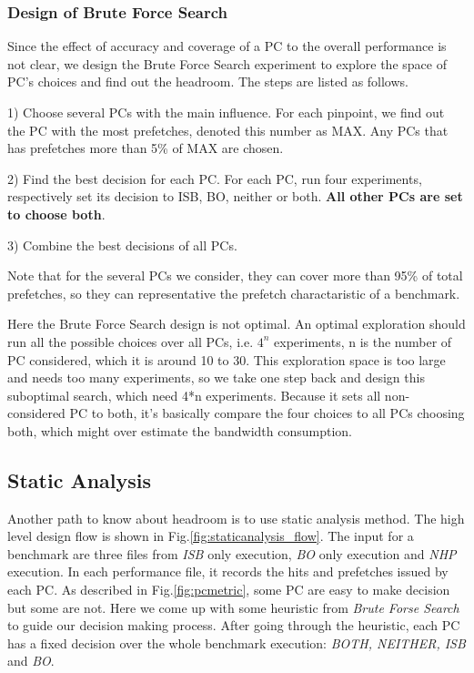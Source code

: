     \subsubsection{Design of Brute Force Search}
    \label{sec:designBFS}
    Since the effect of accuracy and coverage of a PC to the overall performance is not clear, we design the Brute Force Search experiment to explore the space of PC's choices and find out the headroom. The steps are listed as follows. \par
    1) Choose several PCs with the main influence. For each pinpoint, we find out the PC with the most prefetches, denoted this number as MAX. Any PCs that has prefetches more than 5\% of MAX are chosen.\par
    2) Find the best decision for each PC. For each PC, run four experiments, respectively set its decision to ISB, BO, neither or both. \textbf{All other PCs are set to choose both}.\par
    3) Combine the best decisions of all PCs.\par
    Note that for the several PCs we consider, they can cover more than 95\% of total prefetches, so they can representative the prefetch charactaristic of a benchmark. \par
    Here the Brute Force Search design is not optimal. An optimal exploration should run all the possible choices over all PCs, i.e. $4^{n}$ experiments, n is the number of PC considered, which it is around 10 to 30.
    This exploration space is too large and needs too many experiments, so we take one step back and design this suboptimal search, which need 4*n experiments. Because it sets all non-considered PC to both, it's basically compare the four choices to all PCs choosing both, which might over estimate the bandwidth consumption. \par

  \subsection{Static Analysis}
  \label{sec:staticanalysis}
  Another path to know about headroom is to use static analysis method. The high level design flow is shown in Fig.\ref{fig:staticanalysis_flow}. The input for a benchmark are three files from \emph{ISB} only execution, \emph{BO} only execution and \emph{NHP} execution. In each performance file, it records the hits and prefetches issued by each PC. As described in Fig.\ref{fig:pcmetric}, some PC are easy to make decision but some are not. Here we come up with some heuristic from \emph{Brute Forse Search} to guide our decision making process. After going through the heuristic, each PC has a fixed decision over the whole benchmark execution: \emph{BOTH, NEITHER, ISB} and \emph{BO}.

